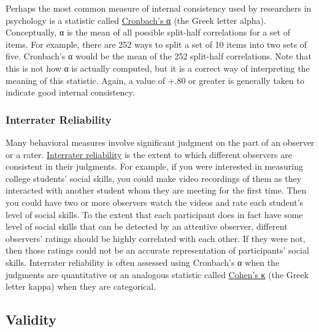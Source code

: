 \documentclass[
]{krantz}
\begin{document}
Perhaps the most common measure of internal consistency used by researchers in psychology is a statistic called \protect\hyperlink{cronbachs-ux3b1}{Cronbach's α} (the Greek letter alpha). Conceptually, α is the mean of all possible split-half correlations for a set of items. For example, there are 252 ways to split a set of 10 items into two sets of five. Cronbach's α would be the mean of the 252 split-half correlations. Note that this is not how α is actually computed, but it is a correct way of interpreting the meaning of this statistic. Again, a value of +.80 or greater is generally taken to indicate good internal consistency.

\hypertarget{interrater-reliability}{%
\subsubsection*{Interrater Reliability}\label{interrater-reliability}}


Many behavioral measures involve significant judgment on the part of an observer or a rater. \protect\hyperlink{interrater-reliability-1}{Interrater reliability} is the extent to which different observers are consistent in their judgments. For example, if you were interested in measuring college students' social skills, you could make video recordings of them as they interacted with another student whom they are meeting for the first time. Then you could have two or more observers watch the videos and rate each student's level of social skills. To the extent that each participant does in fact have some level of social skills that can be detected by an attentive observer, different observers' ratings should be highly correlated with each other. If they were not, then those ratings could not be an accurate representation of participants' social skills. Interrater reliability is often assessed using Cronbach's α when the judgments are quantitative or an analogous statistic called \protect\hyperlink{cohens-ux3ba}{Cohen's κ} (the Greek letter kappa) when they are categorical.

\hypertarget{validity}{%
\subsection*{Validity}\label{validity}}
\end{document}
